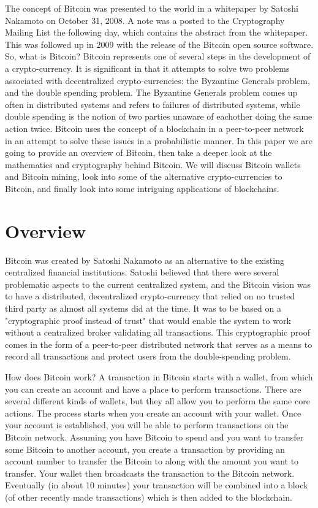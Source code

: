 \documentclass{article}
\begin{document}
	The concept of Bitcoin was presented to the world in a whitepaper by Satoshi Nakamoto on October 31, 2008. A note was a posted to the Cryptography Mailing List the following day, which contains the abstract from the whitepaper. This was followed up in 2009 with the release of the Bitcoin open source software. So, what is Bitcoin? Bitcoin represents one of several steps in the development of a crypto-currency. It is significant in that it attempts to solve two problems associated with decentralized crypto-currencies: the Byzantine Generals problem, and the double spending problem. The Byzantine Generals problem comes up often in distributed systems and refers to failures of distributed systems, while double spending is the notion of two parties unaware of eachother doing the same action twice. Bitcoin uses the concept of a blockchain in a peer-to-peer network in an attempt to solve these issues in a probabilistic manner. In this paper we are going to provide an overview of Bitcoin, then take a deeper look at the mathematics and cryptography behind Bitcoin. We will discuss Bitcoin wallets and Bitcoin mining, look into some of the alternative crypto-currencies to Bitcoin, and finally look into some intriguing applications of blockchains.




\section{Overview}

	Bitcoin was created by Satoshi Nakamoto as an alternative to the existing centralized financial institutions. Satoshi believed that there were several problematic aspects to the current centralized system, and the Bitcoin vision was to have a distributed, decentralized crypto-currency that relied on no trusted third party as almost all systems did at the time. It was to be based on a "cryptographic proof instead of trust" that would enable the system to work without a centralized broker validating all transactions. This cryptographic proof comes in the form of a peer-to-peer distributed network that serves as a means to record all transactions and protect users from the double-spending problem.
	
	How does Bitcoin work? A transaction in Bitcoin starts with a wallet, from which you can create an account and have a place to perform transactions. There are several different kinds of wallets, but they all allow you to perform the same core actions. The process starts when you create an account with your wallet. Once your account is established, you will be able to perform transactions on the Bitcoin network. Assuming you have Bitcoin to spend and you want to transfer some Bitcoin to another account, you create a transaction by providing an account number to transfer the Bitcoin to along with the amount you want to transfer. Your wallet then broadcasts the transaction to the Bitcoin network. Eventually (in about 10 minutes) your transaction will be combined into a block (of other recently made transactions) which is then added to the blockchain.
	
\end{document}
